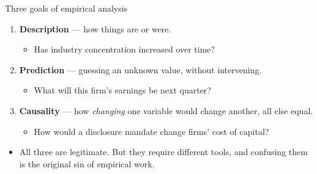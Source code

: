 \documentclass[
  11pt,
  ignorenonframetext,
  aspectratio=169,
]{beamer}
\providecommand{\tightlist}{%
  \setlength{\itemsep}{0pt}\setlength{\parskip}{0pt}}
\begin{document}
\begin{frame}{Three goals of empirical analysis}
\protect{}\label{three-goals-of-empirical-analysis}
\begin{enumerate}
\tightlist
\item
  \textbf{Description} --- how things are or were.

  \begin{itemize}
  \tightlist
  \item
    Has industry concentration increased over time?
  \end{itemize}
\item
  \textbf{Prediction} --- guessing an unknown value, without
  intervening.

  \begin{itemize}
  \tightlist
  \item
    What will this firm's earnings be next quarter?
  \end{itemize}
\item
  \textbf{Causality} --- how \emph{changing} one variable would change
  another, all else equal.

  \begin{itemize}
  \tightlist
  \item
    How would a disclosure mandate change firms' cost of capital?
  \end{itemize}
\end{enumerate}

\vspace{0.5em}

\begin{itemize}
\tightlist
\item
  All three are legitimate. But they require different tools, and
  confusing them is the original sin of empirical work.
\end{itemize}
\end{frame}
\end{document}
